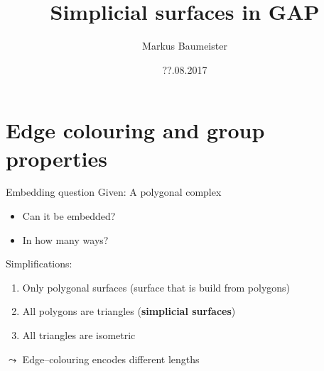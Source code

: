 \documentclass[11pt, handout]{beamer}
\author{Markus Baumeister}
\title{Simplicial surfaces in GAP}
\date{??.08.2017}
\begin{document}
\begin{frame}
\titlepage
\end{frame}


\begin{frame}
    \tableofcontents
\end{frame}



            
\section{Edge colouring and group properties}
\newcommand{\colA}{blue}
\newcommand{\colB}{red}
\newcommand{\colC}{green!80!black}
\newcommand{\width}{very thick}
\frame{\tableofcontents[currentsection]}


\begin{frame}{Embedding question}
    \pause
    Given: A polygonal complex
    \begin{itemize}
        \pause
        \item Can it be embedded?
        \pause
        \item In how many ways?
    \end{itemize}
    \pause
    Simplifications:
    \begin{enumerate}
        \pause
        \item Only polygonal surfaces (surface that is build from polygons)
        \pause
        \item All polygons are triangles (\textbf{simplicial surfaces})
        \pause
        \item All triangles are isometric
    \end{enumerate}
    \pause
    $\leadsto$ Edge--colouring encodes different lengths
            \begin{center}
            \end{center}
\end{frame}
\end{document}

